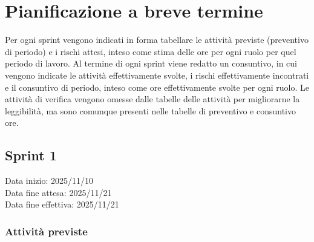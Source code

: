\documentclass[a4paper,12pt]{article}
\begin{document}
\begin{table}[H]
\end{table}


\section{Pianificazione a breve termine}

Per ogni sprint vengono indicati in forma tabellare le attività previste (preventivo di periodo) e i rischi attesi, inteso come stima delle ore per ogni ruolo per quel periodo di lavoro. Al termine di ogni sprint viene redatto un consuntivo, in cui vengono indicate le attività effettivamente svolte, i rischi effettivamente incontrati e il consuntivo di periodo, inteso come ore effettivamente svolte per ogni ruolo.
Le attività di verifica vengono omesse dalle tabelle delle attività per migliorarne la leggibilità, ma sono comunque presenti nelle tabelle di preventivo e consuntivo ore.

\subsection{Sprint 1}
Data inizio: 2025/11/10\\
Data fine attesa: 2025/11/21\\
Data fine effettiva: 2025/11/21

\subsubsection{Attività previste}
\end{document}
